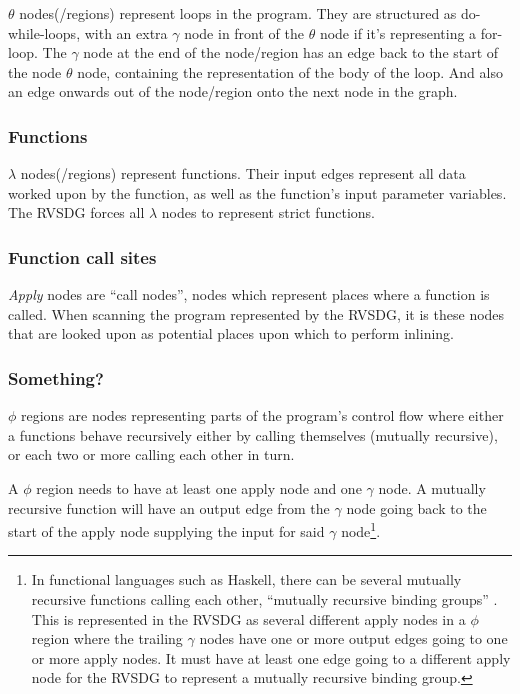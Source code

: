 \textit{$\theta$} nodes(/regions) represent loops in the program. They are
structured as do-while-loops, with an extra $\gamma$ node in front of the
$\theta$ node if it's representing a for-loop. The $\gamma$ node at the end of
the node/region has an edge back to the start of the node $\theta$ node,
containing the representation of the body of the loop. And also an edge onwards
out of the node/region onto the next node in the graph.

\subsubsection{Functions}

\textit{$\lambda$} nodes(/regions) represent functions. Their input
edges represent all data worked upon by the function, as well as the function's
input parameter variables. The RVSDG forces all $\lambda$ nodes to represent
strict functions.

\subsubsection{Function call sites}

\textit{Apply} nodes are ``call nodes'', nodes which represent places
where a function is called. When scanning the program represented by the RVSDG,
it is these nodes that are looked upon as potential places upon which to perform
inlining.

\subsubsection{Something?}

\textit{$\phi$} regions are nodes representing parts of the program's
control flow where either a functions behave recursively either by calling
themselves (mutually recursive), or each two or more calling each other in turn.

A $\phi$ region needs to have at least one apply node and one $\gamma$ node. A
mutually recursive function will have an output edge from the $\gamma$ node
going back to the start of the apply node supplying the input for said $\gamma$
node\footnote{In functional languages such as Haskell, there can be several
mutually recursive functions calling each other, ``mutually recursive binding
groups'' \cite{GHCPaper}. This is represented in the RVSDG as several different
apply nodes in a $\phi$ region  where the trailing $\gamma$ nodes have one or
more output edges going to one or more apply nodes. It must have at least one
edge going to a different apply node for the RVSDG to represent a mutually
recursive binding group.}.
